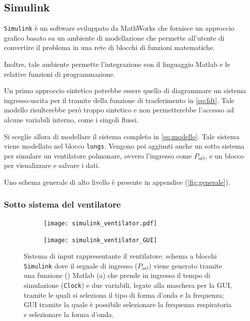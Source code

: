 \subsection{Simulink}


 \texttt{Simulink} \cite{simulink} è un software sviluppato da MathWorks che fornisce un approccio grafico basato su un ambiente di modellazione che permette all'utente di convertire il problema in una rete di blocchi di funzioni matematiche. 

Inoltre, tale ambiente permette l'integrazione con il linguaggio Matlab e le relative funzioni di programmazione. 

Un primo approccio sintetico potrebbe essere quello di diagrammare un sistema ingresso-uscita per il tramite della funzione di trasferimento in \cref{eq:fdt}. Tale modello risulterebbe però troppo sintetico e non permetterebbe l'accesso ad alcune variabili interno, come i singoli flussi.

Si sceglie allora di modellare il sistema completo in \cref{eq:modello}. Tale sistema viene modellato nel blocco \texttt{lungs}. Vengono poi aggiunti anche un sotto sistema per simulare un ventilatore polmonare, ovvero l'ingresso come $P_{aO}$, e un blocco per visualizzare e salvare i dati.

Uno schema generale di alto livello è presente in appendice (\cref{fig:generale}).


\subsubsection{Sotto sistema del ventilatore}


\begin{figure}[t!]
	\centering
	\begin{subfigure}{0.4\linewidth}
		\centering
		\texttt{[image: simulink\_ventilator.pdf]}
		\caption{}
	\end{subfigure}\hfill
	\begin{subfigure}{0.6\linewidth}
		\centering
		\texttt{[image: simulink\_ventilator\_GUI]}
		\caption{}
		\label{fig:mask}
	\end{subfigure}\hfill
	\caption{Sistema di input rappresentante il ventilatore: schema a blocchi  \texttt{Simulink} dove il segnale di ingresso ($P_{aO}$) viene generato tramite una funzione () Matlab (a) che prende in ingresso il tempo di simulazione (\texttt{Clock}) e due variabili, legate alla maschera per la GUI, tramite le quali si seleziona il tipo di forma d'onda e la frequenza; GUI tramite la quale è possibile selezionare la frequenza respiratoria e selezionare la forma d'onda.}
\end{figure}


